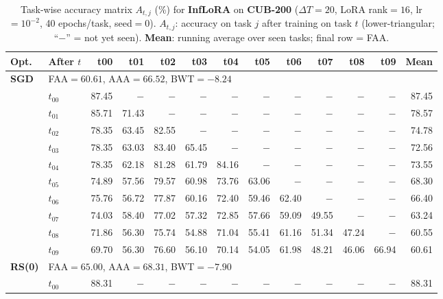 \begin{table}[ht]
\centering
\caption{%
  Task-wise accuracy matrix $A_{t,j}$ (\%) for \textbf{InfLoRA} on \textbf{CUB-200} ($\Delta T=20$, LoRA rank$=16$, lr$=10^{-2}$, 40 epochs/task, seed$=0$).
  $A_{t,j}$: accuracy on task $j$ after training on task $t$  (lower-triangular; ``$-$'' = not yet seen).
  \textbf{Mean}: running average over seen tasks; final row = FAA.
}
\label{tab:raw_inflora_cub200}
\setlength{\tabcolsep}{2.8pt}
\renewcommand{\arraystretch}{0.88}
\scriptsize
\begin{tabular}{@{}l l r r r r r r r r r r r@{}}
\toprule
\textbf{Opt.} & \textbf{After $t$} & \textbf{t00} & \textbf{t01} & \textbf{t02} & \textbf{t03} & \textbf{t04} & \textbf{t05} & \textbf{t06} & \textbf{t07} & \textbf{t08} & \textbf{t09} & \textbf{Mean} \\
\midrule
\multirow{11}{*}{\textbf{SGD}} & \multicolumn{12}{l}{\quad\small FAA$=60.61$,\; AAA$=66.52$,\; BWT$=-8.24$} \\
 & $t_{00}$ & 87.45 & $-$ & $-$ & $-$ & $-$ & $-$ & $-$ & $-$ & $-$ & $-$ & 87.45 \\
 & $t_{01}$ & 85.71 & 71.43 & $-$ & $-$ & $-$ & $-$ & $-$ & $-$ & $-$ & $-$ & 78.57 \\
 & $t_{02}$ & 78.35 & 63.45 & 82.55 & $-$ & $-$ & $-$ & $-$ & $-$ & $-$ & $-$ & 74.78 \\
 & $t_{03}$ & 78.35 & 63.03 & 83.40 & 65.45 & $-$ & $-$ & $-$ & $-$ & $-$ & $-$ & 72.56 \\
 & $t_{04}$ & 78.35 & 62.18 & 81.28 & 61.79 & 84.16 & $-$ & $-$ & $-$ & $-$ & $-$ & 73.55 \\
 & $t_{05}$ & 74.89 & 57.56 & 79.57 & 60.98 & 73.76 & 63.06 & $-$ & $-$ & $-$ & $-$ & 68.30 \\
 & $t_{06}$ & 75.76 & 56.72 & 77.87 & 60.16 & 72.40 & 59.46 & 62.40 & $-$ & $-$ & $-$ & 66.40 \\
 & $t_{07}$ & 74.03 & 58.40 & 77.02 & 57.32 & 72.85 & 57.66 & 59.09 & 49.55 & $-$ & $-$ & 63.24 \\
 & $t_{08}$ & 71.86 & 56.30 & 75.74 & 54.88 & 71.04 & 55.41 & 61.16 & 51.34 & 47.24 & $-$ & 60.55 \\
 & $t_{09}$ & 69.70 & 56.30 & 76.60 & 56.10 & 70.14 & 54.05 & 61.98 & 48.21 & 46.06 & 66.94 & 60.61 \\
\midrule
\multirow{11}{*}{\textbf{RS(0)}} & \multicolumn{12}{l}{\quad\small FAA$=65.00$,\; AAA$=68.31$,\; BWT$=-7.90$} \\
 & $t_{00}$ & 88.31 & $-$ & $-$ & $-$ & $-$ & $-$ & $-$ & $-$ & $-$ & $-$ & 88.31 \\

\end{tabular}
\end{table}
